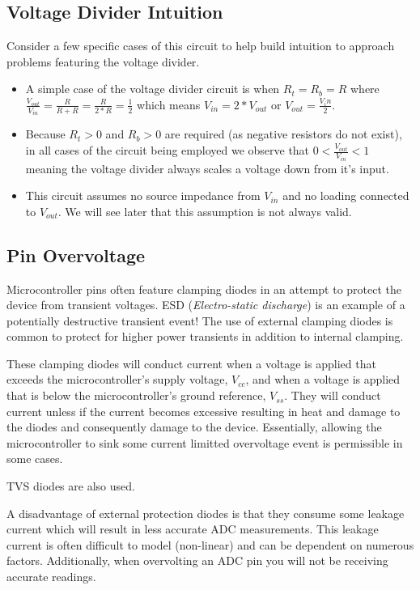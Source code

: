 \documentclass[main.tex]{subfiles}
\begin{document}
\subsection{Voltage Divider Intuition}
Consider a few specific cases of this circuit to help build intuition to approach problems featuring the voltage divider.
\begin{itemize}
    \item A simple case of the voltage divider circuit is when $R_t = R_b = R$ where $\frac{V_{out}}{V_{in}} = \frac{R}{R+R} = \frac{R}{2*R} = \frac{1}{2}$ which means $V_{in} = 2 * V_{out}$ or $V_{out} = \frac{V_in}{2}$.
    \item Because $R_t > 0$ and $R_b > 0$ are required (as negative resistors do not exist), in all cases of the circuit being employed we observe that $0 < \frac{V_{out}}{V_{in}} < 1$ meaning the voltage divider always scales a voltage down from it's input. 
    \item This circuit assumes no source impedance from $V_{in}$ and no loading connected to $V_{out}$. We will see later that this assumption is not always valid. 
\end{itemize}

\subsection{Pin Overvoltage}
Microcontroller pins often feature clamping diodes in an attempt to protect the device from transient voltages. ESD (\textit{Electro-static discharge}) is an example of a potentially destructive transient event! The use of external clamping diodes is common to protect for higher power transients in addition to internal clamping. 


These clamping diodes will conduct current when a voltage is applied that exceeds the microcontroller's supply voltage, $V_{cc}$, and when a voltage is applied that is below the microcontroller's ground reference, $V_{ss}$. They will conduct current unless if the current becomes excessive resulting in heat and damage to the diodes and consequently damage to the device. Essentially, allowing the microcontroller to sink some current limitted overvoltage event is permissible in some cases. 

TVS diodes are also used. 

A disadvantage of external protection diodes is that they consume some leakage current which will result in less accurate ADC measurements. This leakage current is often difficult to model (non-linear) and can be dependent on numerous factors. Additionally, when overvolting an ADC pin you will not be receiving accurate readings.
\end{document}
